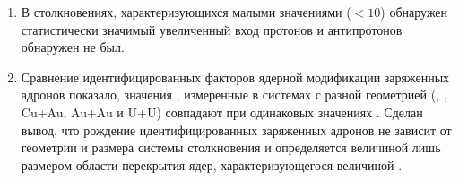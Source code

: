 \begin{enumerate}
\item В столкновениях, характеризующихся малыми значениями \Npart (\Npart$<10$) обнаружен статистически значимый увеличенный вход протонов и антипротонов обнаружен не был.

\item Сравнение идентифицированных факторов ядерной модификации заряженных адронов показало, значения \rab, измеренные в системах с разной геометрией (\dau, \heau, Cu+Au, Au+Au и U+U) совпадают при одинаковых значениях \Npart.
Сделан вывод, что рождение идентифицированных заряженных адронов не зависит от геометрии и размера системы столкновения и определяется величиной лишь размером области перекрытия ядер, характеризующегося величиной \Npart.

\end{enumerate}
